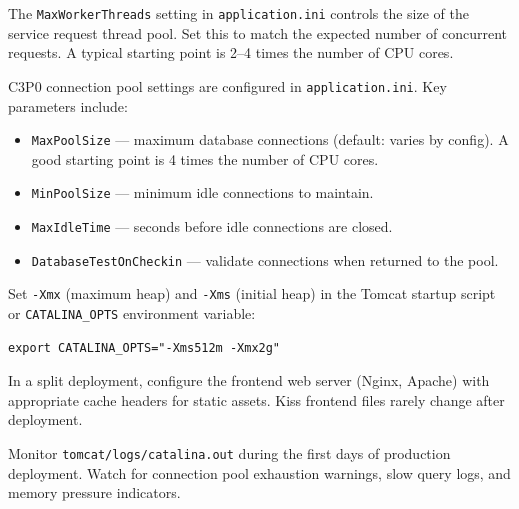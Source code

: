 \begin{description}[style=nextline]
  \item[Worker threads] The \texttt{MaxWorkerThreads} setting in \texttt{application.ini} controls the size of the service request thread pool.  Set this to match the expected number of concurrent requests.  A typical starting point is 2--4 times the number of CPU cores.

  \item[Connection pool] C3P0 connection pool settings are configured in \texttt{application.ini}.  Key parameters include:
  \begin{itemize}
    \item \texttt{MaxPoolSize} --- maximum database connections (default: varies by config).  A good starting point is 4 times the number of CPU cores.
    \item \texttt{MinPoolSize} --- minimum idle connections to maintain.
    \item \texttt{MaxIdleTime} --- seconds before idle connections are closed.
    \item \texttt{DatabaseTestOnCheckin} --- validate connections when returned to the pool.
  \end{itemize}

  \item[JVM memory] Set \texttt{-Xmx} (maximum heap) and \texttt{-Xms} (initial heap) in the Tomcat startup script or \texttt{CATALINA\_OPTS} environment variable:
  \begin{lstlisting}[style=shell]
export CATALINA_OPTS="-Xms512m -Xmx2g"
  \end{lstlisting}

  \item[Static file caching] In a split deployment, configure the frontend web server (Nginx, Apache) with appropriate cache headers for static assets.  Kiss frontend files rarely change after deployment.
\end{description}

\begin{tipbox}
Monitor \texttt{tomcat/logs/catalina.out} during the first days of production deployment.  Watch for connection pool exhaustion warnings, slow query logs, and memory pressure indicators.
\end{tipbox}
